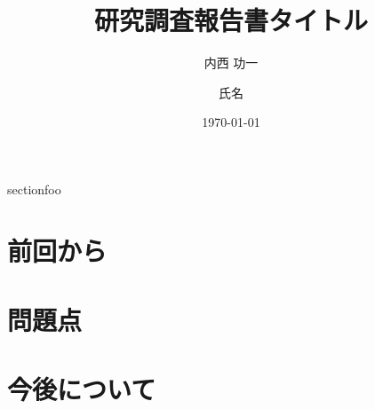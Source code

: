 \documentclass[11pt]{./lib/cs-thesis-kai}
\title{研究調査報告書}
\author{内西 功一}
\date{\today}
\title{タイトル}
\author{氏名}
\begin{document}
 

%
%
\titlepage
\makeatletter
\abstract



section{foo}



\tableofcontents
 \listoffigures
 \listoftables

\section{前回から}
\section{問題点}
\section{今後について}
\end{document}
